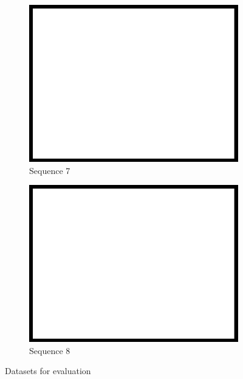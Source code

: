 \begin{figure}
\begin{subfigure}{0.49\columnwidth}
    \includegraphics[width=1.00\textwidth]{media/dummy.jpg}
    \caption{Sequence 7}
		\label{fig:datasets_7}
  \end{subfigure}
	\begin{subfigure}{0.49\columnwidth}
    \centering
    \includegraphics[width=1.00\textwidth]{media/dummy.jpg}
		\caption{Sequence 8}
		\label{fig:datasets_8}
  \end{subfigure}
\caption{Datasets for evaluation}
\label{fig:datasets}
\end{figure}